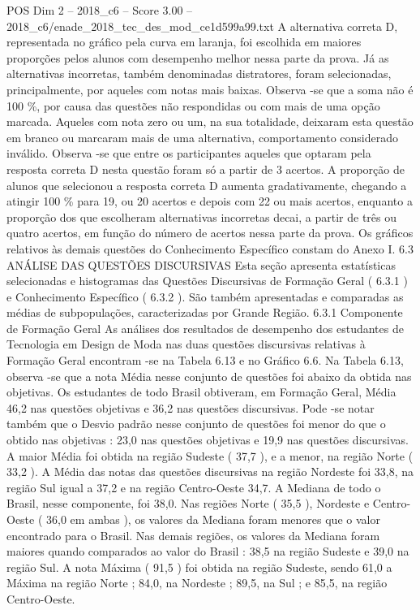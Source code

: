 \begin{textsample}{POS Dim 2 – 2018\_c6 – Score 3.00 – 2018\_c6/enade\_2018\_tec\_des\_mod\_ce1d599a99.txt}
A alternativa correta D, representada no gráfico pela curva em laranja, foi escolhida em maiores proporções pelos alunos com desempenho melhor nessa parte da prova.
Já as alternativas incorretas, também denominadas distratores, foram selecionadas, principalmente, por aqueles com notas mais baixas.
Observa -se que a soma não é 100 \%, por causa das questões não respondidas ou com mais de uma opção marcada.
Aqueles com nota zero ou um, na sua totalidade, deixaram esta questão em branco ou marcaram mais de uma alternativa, comportamento considerado inválido.
Observa -se que entre os participantes aqueles que optaram pela resposta correta D nesta questão foram só a partir de 3 acertos.
A proporção de alunos que selecionou a resposta correta D aumenta gradativamente, chegando a atingir 100 \% para 19, ou 20 acertos e depois com 22 ou mais acertos, enquanto a proporção dos que escolheram alternativas incorretas decai, a partir de três ou quatro acertos, em função do número de acertos nessa parte da prova.
Os gráficos relativos às demais questões do Conhecimento Específico constam do Anexo I. 6.3 ANÁLISE DAS QUESTÕES DISCURSIVAS Esta seção apresenta estatísticas selecionadas e histogramas das Questões Discursivas de Formação Geral ( 6.3.1 ) e Conhecimento Específico ( 6.3.2 ).
São também apresentadas e comparadas as médias de subpopulações, caracterizadas por Grande Região. 6.3.1 Componente de Formação Geral As análises dos resultados de desempenho dos estudantes de Tecnologia em Design de Moda nas duas questões discursivas relativas à Formação Geral encontram -se na Tabela 6.13 e no Gráfico 6.6.
Na Tabela 6.13, observa -se que a nota Média nesse conjunto de questões foi abaixo da obtida nas objetivas.
Os estudantes de todo Brasil obtiveram, em Formação Geral, Média 46,2 nas questões objetivas e 36,2 nas questões discursivas.
Pode -se notar também que o Desvio padrão nesse conjunto de questões foi menor do que o obtido nas objetivas : 23,0 nas questões objetivas e 19,9 nas questões discursivas.
A maior Média foi obtida na região Sudeste ( 37,7 ), e a menor, na região Norte ( 33,2 ).
A Média das notas das questões discursivas na região Nordeste foi 33,8, na região Sul igual a 37,2 e na região Centro-Oeste 34,7.
A Mediana de todo o Brasil, nesse componente, foi 38,0.
Nas regiões Norte ( 35,5 ), Nordeste e Centro-Oeste ( 36,0 em ambas ), os valores da Mediana foram menores que o valor encontrado para o Brasil.
Nas demais regiões, os valores da Mediana foram maiores quando comparados ao valor do Brasil : 38,5 na região Sudeste e 39,0 na região Sul.
A nota Máxima ( 91,5 ) foi obtida na região Sudeste, sendo 61,0 a Máxima na região Norte ; 84,0, na Nordeste ; 89,5, na Sul ; e 85,5, na região Centro-Oeste.

\end{textsample}
